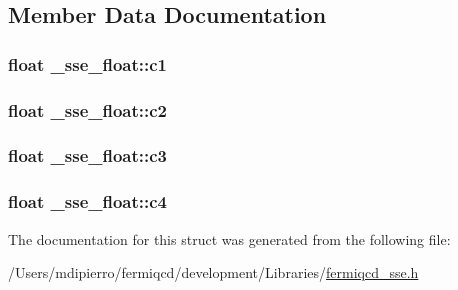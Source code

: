 \subsection{Member Data Documentation}
\hypertarget{struct__sse__float_a32051c01c5b26be1e6a12d4d2fee579f}{
\subsubsection[{c1}]{\setlength{\rightskip}{0pt plus 5cm}float {\bf \_\-sse\_\-float::c1}}}
\label{struct__sse__float_a32051c01c5b26be1e6a12d4d2fee579f}
\hypertarget{struct__sse__float_a3a7034f3f255a7be18aa97f70449dcce}{
\subsubsection[{c2}]{\setlength{\rightskip}{0pt plus 5cm}float {\bf \_\-sse\_\-float::c2}}}
\label{struct__sse__float_a3a7034f3f255a7be18aa97f70449dcce}
\hypertarget{struct__sse__float_a0ab5699672836110060c9128cab16f89}{
\subsubsection[{c3}]{\setlength{\rightskip}{0pt plus 5cm}float {\bf \_\-sse\_\-float::c3}}}
\label{struct__sse__float_a0ab5699672836110060c9128cab16f89}
\hypertarget{struct__sse__float_ada575beb64ed670b52342b02a2978bc4}{
\subsubsection[{c4}]{\setlength{\rightskip}{0pt plus 5cm}float {\bf \_\-sse\_\-float::c4}}}
\label{struct__sse__float_ada575beb64ed670b52342b02a2978bc4}


The documentation for this struct was generated from the following file:\begin{DoxyCompactItemize}
\item 
/Users/mdipierro/fermiqcd/development/Libraries/\hyperlink{fermiqcd__sse_8h}{fermiqcd\_\-sse.h}\end{DoxyCompactItemize}
